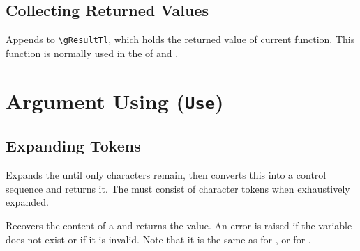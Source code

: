 \documentclass[oneside]{book}
\begin{document}
\section{Collecting Returned Values}

\begin{function}{\Result}
\begin{syntax}
 
\end{syntax}
Appends  to \verb!\gResultTl!, which holds the returned value of current function.
This function is normally used in the  of  and .
\end{function}

\chapter{Argument Using (\texttt{Use})}

\section{Expanding Tokens}

\begin{function}{\Name}
\begin{syntax}
 
\end{syntax}
Expands the  until only characters
remain, then converts this into a control sequence and returns it.
The  must consist of character tokens %
when exhaustively expanded.%
\end{function}

\begin{function}{\Value}
\begin{syntax}
 
\end{syntax}
Recovers the content of a  and returns the value.
An error is raised if the variable does not exist or if it is invalid.
Note that it is the same as  for , or  for .
\end{function}
\end{document}
